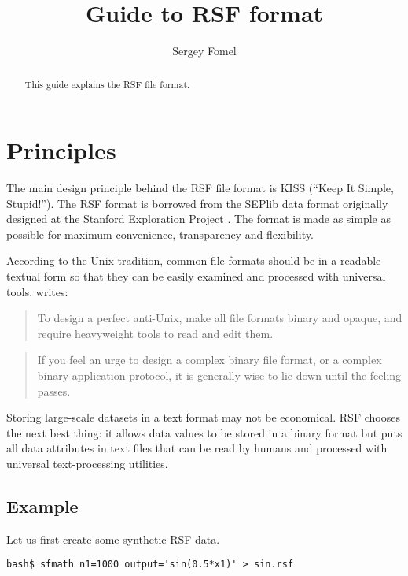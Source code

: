 \title{Guide to RSF format}
\author{Sergey Fomel}

\maketitle

\begin{abstract}

  This guide explains the RSF file format.

\end{abstract}


\section{Principles}

The main design principle behind the RSF file format is KISS (``Keep It
Simple, Stupid!''). The RSF format is borrowed from the SEPlib data format
originally designed at the Stanford Exploration Project
\cite[]{Claerbout.sep.70.413}. The format is made as simple as possible for
maximum convenience, transparency and flexibility.

According to the Unix tradition, common file formats should be in a readable
textual form so that they can be easily examined and processed with universal
tools.  \cite{taoup} writes:
\begin{quote}
  To design a perfect anti-Unix, make all file formats binary and opaque, and
  require heavyweight tools to read and edit them.
\end{quote}
\begin{quote}
  If you feel an urge to design a complex binary file format, or a complex
  binary application protocol, it is generally wise to lie down until the
  feeling passes.
\end{quote}

Storing large-scale datasets in a text format may not be economical. RSF
chooses the next best thing: it allows data values to be stored in a binary
format but puts all data attributes in text files that can be read by humans
and processed with universal text-processing utilities.

\subsection{Example}

Let us first create some synthetic RSF data.
\begin{verbatim}
bash$ sfmath n1=1000 output='sin(0.5*x1)' > sin.rsf
\end{verbatim}

